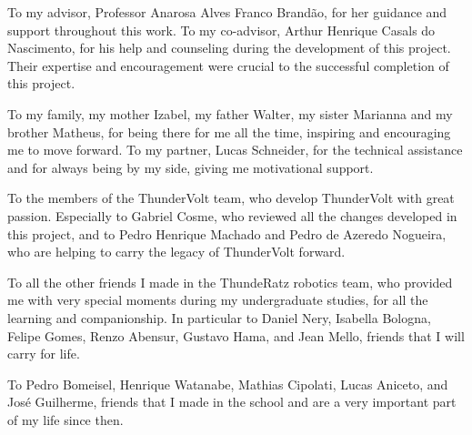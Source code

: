 \begin{agradecimentos}
    To my advisor, Professor Anarosa Alves Franco Brandão, for her guidance and support throughout this work. To my co-advisor, Arthur Henrique Casals do Nascimento, for his help and counseling during the development of this project. Their expertise and encouragement were crucial to the successful completion of this project.

    To my family, my mother Izabel, my father Walter, my sister Marianna and my brother Matheus, for being there for me all the time, inspiring and encouraging me to move forward. To my partner, Lucas Schneider, for the technical assistance and for always being by my side, giving me motivational support.

    To the members of the ThunderVolt team, who develop ThunderVolt with great passion. Especially to Gabriel Cosme, who reviewed all the changes developed in this project, and to Pedro Henrique Machado and Pedro de Azeredo Nogueira, who are helping to carry the legacy of ThunderVolt forward.

    To all the other friends I made in the ThundeRatz robotics team, who provided me with very special moments during my undergraduate studies, for all the learning and companionship. In particular to Daniel Nery, Isabella Bologna, Felipe Gomes, Renzo Abensur, Gustavo Hama, and Jean Mello, friends that I will carry for life.

    To Pedro Bomeisel, Henrique Watanabe, Mathias Cipolati, Lucas Aniceto, and José Guilherme, friends that I made in the school and are a very important part of my life since then.
\end{agradecimentos}
